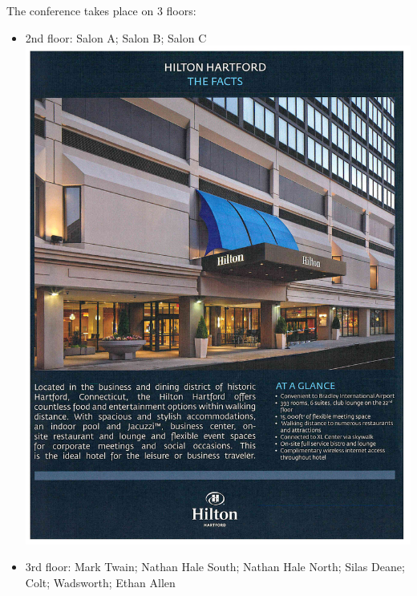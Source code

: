 \documentclass[10pt]{article}
\begin{document}
The conference takes place on 3 floors:

\vfill
\begin{itemize}
\item 2nd floor: Salon A; Salon B; Salon C
  \vfill
  \includegraphics[page=3, width=\textwidth, viewport=.23in 5.3in
  8.1in 9.07in, clip=true]{hilton.pdf}
  \vfill
\item 3rd floor: Mark Twain; Nathan Hale South; Nathan Hale North;
  Silas Deane; Colt; Wadsworth; Ethan Allen
  \vfill

\end{itemize}
\end{document}
